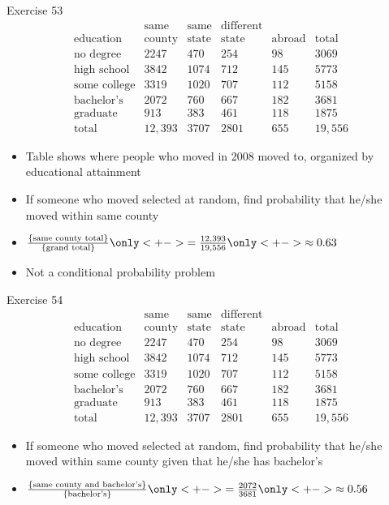 \documentclass{beamer}
\theoremstyle{definition}
\begin{document}
\begin{frame}{Exercise 53}
\[\begin{array}{r|llll|l}
&\text{same}&\text{same}&\text{different}&&\\
\text{education}&\text{county}
&\text{state}&\text{state}&\text{abroad}&\text{total}\\\hline
\text{no degree}&2247&470&254&98&3069\\
\text{high school}&3842&1074&712&145&5773\\
\text{some college}&3319&1020&707&112&5158\\
\text{bachelor's}&2072&760&667&182&3681\\
\text{graduate}&913&383&461&118&1875\\\hline
\text{total}&12,393&3707&2801&655&19,556
\end{array}\]
\begin{itemize}
\item Table shows where people who moved in 2008
moved to, organized by educational attainment
\item If someone who moved selected at random, find probability
that he/she moved within same county
\item $\frac{\left\{\text{same county total}\right\}}
{\left\{\text{grand total}\right\}}
\only<+->{=\frac{12,393}{19,556}}\only<+->{\approx 0.63}$
\item Not a conditional probability problem
\end{itemize}
\end{frame}

\begin{frame}{Exercise 54}
\[\begin{array}{r|llll|l}
&\text{same}&\text{same}&\text{different}&&\\
\text{education}&\text{county}
&\text{state}&\text{state}&\text{abroad}&\text{total}\\\hline
\text{no degree}&2247&470&254&98&3069\\
\text{high school}&3842&1074&712&145&5773\\
\text{some college}&3319&1020&707&112&5158\\
\text{bachelor's}&2072&760&667&182&3681\\
\text{graduate}&913&383&461&118&1875\\\hline
\text{total}&12,393&3707&2801&655&19,556
\end{array}\]
\begin{itemize}
\item If someone who moved selected at random, find probability
that he/she moved within same county given that he/she has bachelor's
\item $\frac{\left\{\text{same county and bachelor's}\right\}}
{\left\{\text{bachelor's}\right\}}
\only<+->{=\frac{2072}{3681}}\only<+->{\approx 0.56}$
\end{itemize}
\end{frame}
\end{document}
